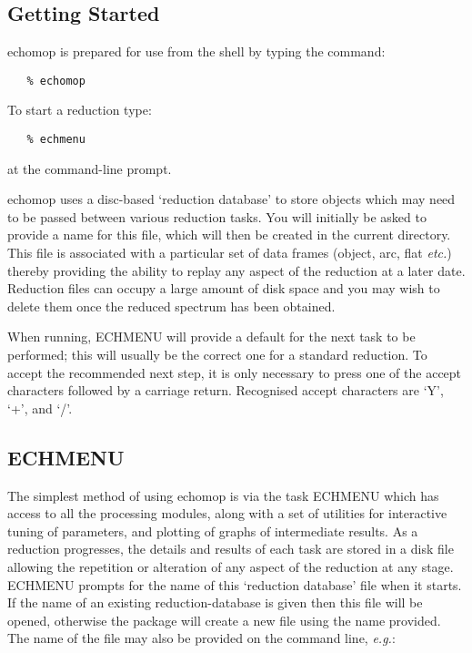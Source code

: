 \subsection{Getting Started}

{\sc echomop} is prepared for use from the shell by typing the command:

\begin{verbatim}
   % echomop
\end{verbatim}

To start a reduction type:

\begin{verbatim}
   % echmenu
\end{verbatim}

at the command-line prompt.

{\sc echomop} uses a disc-based `reduction database' to store objects which may need
to be passed between various reduction tasks.
You will initially be asked to provide a name for this file, which will then
be created in the current directory.
This file is associated with a particular set of data frames
(object, arc, flat {\it etc.}) thereby providing the ability to
replay any aspect of the reduction at a later date.
Reduction files can occupy a large amount of disk space and you may wish to
delete them once the reduced spectrum has been obtained.

When running, ECHMENU will provide a default for the next task to be
performed; this will usually be the correct one for a standard reduction.
To accept the recommended next step, it is only necessary to press one of the
accept characters followed by a carriage return.  Recognised accept characters
are `Y', `+', and `/'. 

\subsection{ECHMENU}

The simplest method of using {\sc echomop} is via the task ECHMENU which has
access to all the processing modules, along with a set of utilities for
interactive tuning of parameters, and plotting of graphs of intermediate
results.  As a reduction progresses, the details and results of each task
are stored in a disk file allowing the repetition or alteration of any aspect
of the reduction at any stage.  ECHMENU
prompts for the name of this `reduction database' file when it
starts.  If the name of an existing reduction-database is given then
this file will be opened, otherwise the package will create a new file
using the name provided.  The name of the file may also be provided on the
command line, {\it{e.g.}}:

